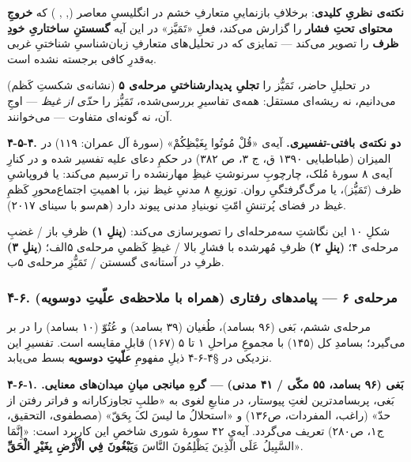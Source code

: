 \begin{RTL}
\begin{otherlanguage}{persian}
\textbf{نکته‌ی نظریِ کلیدی}: برخلافِ بازنماییِ متعارفِ خشم در انگلیسیِ معاصر
(, , ) که \textbf{خروجِ محتوای
تحتِ فشار} را گزارش می‌کند، فعلِ «تَمَيَّز» در این آیه \textbf{گسستنِ ساختاریِ
خودِ ظرف} را تصویر می‌کند --- تمایزی که در تحلیل‌های متعارفِ زبان‌شناسیِ
شناختیِ غربی به‌قدرِ کافی برجسته نشده است.

در تحلیلِ حاضر، تَمَیُّز را \textbf{تجلیِ پدیدارشناختیِ مرحله‌ی ۵} (نشانه‌ی شکستِ
کَظم) می‌دانیم، نه ریشه‌ای مستقل: همه‌ی تفاسیرِ بررسی‌شده، تَمَیُّز را \emph{حدّی
از غیظ} --- اوجِ آن، نه گونه‌ای متفاوت --- می‌خوانند.

\textbf{۴-۵-۴. دو نکته‌ی بافتی-تفسیری.} آیه‌ی «قُلْ مُوتُوا بِغَيْظِكُمْ» (سورۀ آل
عمران: ۱۱۹) در المیزان (طباطبایی ۱۳۹۰ ق، ج ۳، ص ۳۸۲) در حکمِ دعای علیه
تفسیر شده و در کنارِ آیه‌ی ۸ سورۀ مُلک، چارچوبِ سرنوشتِ غیظِ مهارنشده را ترسیم
می‌کند: یا فروپاشیِ ظرف (تَمَیُّز)، یا مرگ‌گرفتگیِ روان. توزیعِ ۸ مدنیِ غیظ نیز،
با اهمیتِ اجتماع‌محورِ کَظمِ غیظ در فضای پُرتنشِ امّتِ نوبنیادِ مدنی پیوند دارد
(هم‌سو با سینای ۲۰۱۷).

شکلِ ۱۰ این نگاشتِ سه‌مرحله‌ای را تصویرسازی می‌کند: \textbf{(پنلِ ۱)} ظرفِ باز
/ غضبِ مرحله‌ی ۴؛ \textbf{(پنلِ ۲)} ظرفِ مُهرشده با فشارِ بالا / غیظِ کَظمیِ
مرحله‌ی ۵الف؛ \textbf{(پنلِ ۳)} ظرفِ در آستانه‌ی گسستن / تَمَیُّزِ مرحله‌ی ۵ب.

\subsubsection{۴-۶. مرحله‌ی ۶ --- پیامدهای رفتاری (همراه با ملاحظه‌ی علّیتِ
دوسویه)}\label{ux645ux631ux62dux644ux647ux6cc-ux6f6-ux67eux6ccux627ux645ux62fux647ux627ux6cc-ux631ux641ux62aux627ux631ux6cc-ux647ux645ux631ux627ux647-ux628ux627-ux645ux644ux627ux62dux638ux647ux6cc-ux639ux644ux6ccux62a-ux62fux648ux633ux648ux6ccux647}

مرحله‌ی ششم، بَغی (۹۶ بسامد)، طُغیان (۳۹ بسامد) و عُتُوّ (۱۰ بسامد) را در بر
می‌گیرد؛ بسامدِ کل (۱۴۵) با مجموعِ مراحلِ ۱ تا ۵ (۱۶۷) قابلِ مقایسه است.
تفسیرِ این نزدیکی در §۴-۶-۴ ذیلِ مفهومِ \textbf{علّیتِ دوسویه} بسط می‌یابد.

\textbf{۴-۶-۱. بَغی (۹۶ بسامد، ۵۵ مکّی / ۴۱ مدنی) --- گرهِ میانجی میانِ
میدان‌های معنایی.} بَغی، پربسامدترین لغتِ پیوستار، در منابعِ لغوی به «طلبِ
تجاوزکارانه و فراتر رفتن از حدّ» (راغب، المفردات، ص۱۳۶) و «استحلالُ ما لیسَ
لکَ بِحَقّ» (مصطفوی، التحقیق، ج۱، ص۲۸۰) تعریف می‌گردد. آیه‌ی ۴۲ سورۀ شوری شاخصِ
این کاربرد است: «إِنَّمَا السَّبِيلُ عَلَى الَّذِينَ يَظْلِمُونَ النَّاسَ وَ\textbf{يَبْغُونَ فِي
الْأَرْضِ بِغَيْرِ الْحَقِّ}».


\end{otherlanguage}
\end{RTL}

